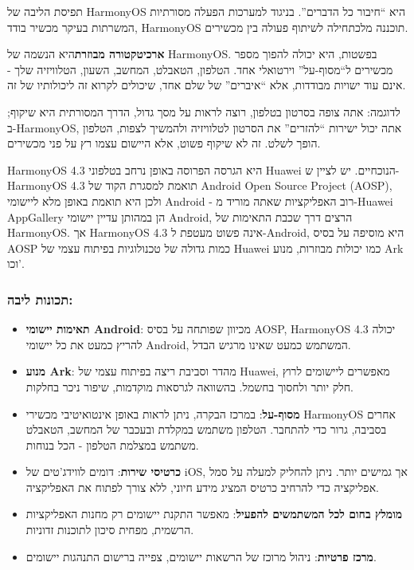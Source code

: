


תפיסת הליבה של HarmonyOS היא “חיבור כל הדברים”. בניגוד למערכות הפעלה מסורתיות המשרתות בעיקר מכשיר בודד, HarmonyOS תוכננה מלכתחילה לשיתוף פעולה בין מכשירים.

\textbf{ארכיטקטורה מבוזרת}היא הנשמה של HarmonyOS. בפשטות, היא יכולה להפוך מספר מכשירים ל“מסוף-על” וירטואלי אחד. הטלפון, הטאבלט, המחשב, השעון, הטלוויזיה שלך - אינם עוד ישויות מבודדות, אלא “איברים” של שלם אחד, שיכולים לקרוא זה ליכולותיו של זה.

לדוגמה: אתה צופה בסרטון בטלפון, רוצה לראות על מסך גדול, הדרך המסורתית היא שיקוף; ב-HarmonyOS, אתה יכול ישירות “להזרים” את הסרטון לטלוויזיה ולהמשיך לצפות, הטלפון הופך לשלט. זה לא שיקוף פשוט, אלא היישום עצמו רץ על פני מכשירים.


HarmonyOS 4.3 היא הגרסה הפרוסה באופן נרחב בטלפוני Huawei הנוכחיים. יש לציין ש-HarmonyOS 4.3 תואמת למסגרת הקוד של Android Open Source Project (AOSP), ולכן היא תואמת באופן מלא ליישומי Android - רוב האפליקציות שאתה מוריד מ-Huawei AppGallery הן במהותן עדיין יישומי Android, הרצים דרך שכבת התאימות של HarmonyOS. אך HarmonyOS 4.3 אינה פשוט מעטפת ל-Android, היא מוסיפה על בסיס AOSP כמות גדולה של טכנולוגיות בפיתוח עצמי של Huawei כמו יכולות מבוזרות, מנוע Ark וכו'.

\subsubsection*{תכונות ליבה:}

\begin{itemize}
  \item \textbf{תאימות יישומי Android}: מכיוון שפותחה על בסיס AOSP, HarmonyOS 4.3 יכולה להריץ כמעט את כל יישומי Android, המשתמש כמעט שאינו מרגיש הבדל.
  \item \textbf{מנוע Ark}: מהדר וסביבת ריצה בפיתוח עצמי של Huawei, מאפשרים ליישומים לרוץ חלק יותר ולחסוך בחשמל. בהשוואה לגרסאות מוקדמות, שיפור ניכר בחלקות.
  \item \textbf{מסוף-על}: במרכז הבקרה, ניתן לראות באופן אינטואיטיבי מכשירי HarmonyOS אחרים בסביבה, גרור כדי להתחבר. הטלפון משתמש במקלדת ובעכבר של המחשב, הטאבלט משתמש במצלמת הטלפון - הכל בנוחות.
  \item \textbf{כרטיסי שירות}: דומים לווידג'טים של iOS, אך גמישים יותר. ניתן להחליק למעלה על סמל אפליקציה כדי להרחיב כרטיס המציג מידע חיוני, ללא צורך לפתוח את האפליקציה.
  \item \textbf{מומלץ בחום לכל המשתמשים להפעיל}: מאפשר התקנת יישומים רק מחנות האפליקציות הרשמית, מפחית סיכון לתוכנות זדוניות.
  \item \textbf{מרכז פרטיות}: ניהול מרוכז של הרשאות יישומים, צפייה ברישום התנהגות יישומים.
\end{itemize}

